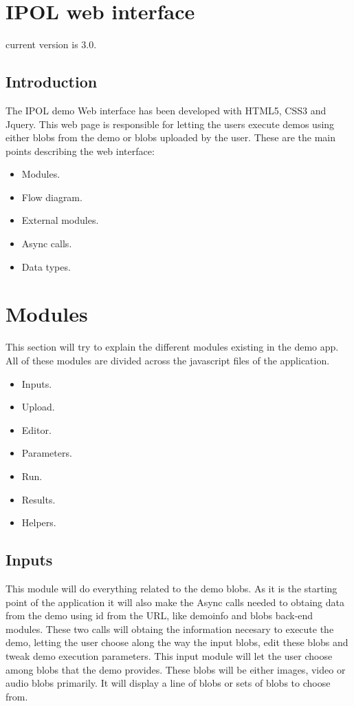 
\section{IPOL web interface}

current version is 3.0.

\subsection{Introduction}
The IPOL demo Web interface has been developed with HTML5, CSS3 and Jquery. 
This web page is responsible for letting the users execute demos using either blobs 
from the demo or blobs uploaded by the user.
These are the main points describing the web interface:
\begin{itemize}
  \item Modules.
  \item Flow diagram.
  \item External modules.
  \item Async calls.
  \item Data types.
\end{itemize}



\section{Modules}
This section will try to explain the different modules existing in the demo app. All of these
 modules are divided across the javascript files of the application.
\begin{itemize}
	\item Inputs.
	\item Upload.
	\item Editor.
	\item Parameters.
	\item Run.
	\item Results.
	\item Helpers.
\end{itemize}

\subsection{Inputs}
This module will do everything related to the demo blobs. As it is the starting point of the 
application it will also make the Async calls needed to obtaing data from the demo using id from the URL, like demoinfo 
and blobs back-end modules. These two calls will obtaing the information necesary to execute the demo, letting the 
user choose along the way the input blobs, edit these blobs and tweak demo execution parameters.
This input module will let the user choose among blobs that the demo provides. These blobs will be either images, video or 
audio blobs primarily. It will display a line of blobs or sets of blobs to choose from.


